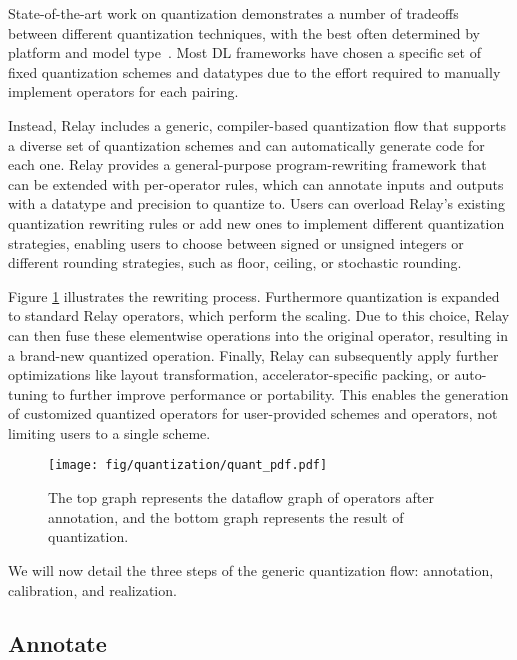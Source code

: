 State-of-the-art work on quantization demonstrates a number of tradeoffs
  between different quantization techniques,
  with the best often determined by platform and model type~\citep{krishnamoorthi18}.
Most DL frameworks have chosen a specific set of fixed quantization
  schemes and datatypes due to the effort required to manually implement operators for
  each pairing.

Instead, Relay includes a generic, compiler-based quantization flow that supports a diverse set
  of quantization schemes and can automatically generate code for each one.
Relay provides a general-purpose program-rewriting framework that can be extended
  with per-operator rules, which can annotate inputs and outputs with a datatype
  and precision to quantize to.
Users can overload Relay's existing quantization rewriting rules or add new ones
  to implement different quantization strategies, enabling users to choose between
  signed or unsigned integers or different rounding strategies, such as
  floor, ceiling, or stochastic rounding.

Figure \ref{fig:quant_flow} illustrates the rewriting process.
Furthermore quantization is expanded to standard
  Relay operators, which perform the scaling.
Due to this choice, Relay can then fuse these elementwise operations
  into the original operator, resulting in a brand-new quantized operation.
Finally, Relay can subsequently apply further optimizations like
  layout transformation, accelerator-specific packing, or
  auto-tuning to further improve performance or portability.
This enables the generation of customized quantized operators
  for user-provided schemes and operators,
  not limiting users to a single scheme.

\begin{figure}[h]
  \texttt{[image: fig/quantization/quant\_pdf.pdf]}
  \caption{\textmd{The top graph represents the dataflow graph of operators after annotation,
  and the bottom graph represents the result of quantization.}}
  \label{fig:quant_flow}
\end{figure}

We will now detail the three steps of the generic quantization flow:
  annotation, calibration, and realization.

\subsection*{Annotate}

